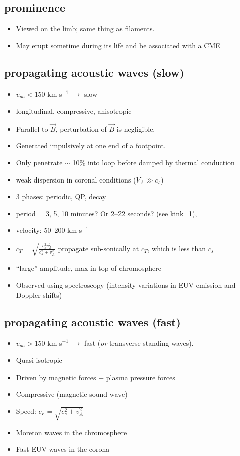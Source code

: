 \documentclass{article}
\begin{document}
\subsection{prominence}
    \begin{itemize}
        \item Viewed on the limb; same thing as filaments.
        \item May erupt sometime during its life and be associated
        with a CME
    \end{itemize}
\subsection{propagating acoustic waves (slow)}
\begin{itemize}
    \item $v_{ph}<150$ km s$^{-1}$ $\rightarrow$ slow
    \item longitudinal, compressive, anisotropic
    \item Parallel to $\vec{B}$, perturbation of $\vec{B}$ is negligible.
    \item Generated impulsively at one end of a footpoint.
    \item Only penetrate $\sim$ 10\% into loop before
        damped by thermal conduction
    \item weak dispersion in coronal conditions ($V_{A} \gg c_{s}$)
    \item 3 phases: periodic, QP, decay
    \item period = 3, 5, 10 minutes? Or 2--22 seconds? (see kink\_1),
    \item velocity: 50--200 km s$^{-1}$
    \item $c_{T} = \sqrt{\frac{c_{s}^2v_{A}^2}{c_{s}^2 + v_{A}^2}} $
        propagate sub-sonically at $c_{T}$, which is less than $c_{s}$
    \item ``large'' amplitude, max in top of chromosphere
    \item Observed using spectroscopy (intensity variations in
        EUV emission  and Doppler shifts)
\end{itemize}
\subsection{propagating acoustic waves (fast)}
\begin{itemize}
    \item $v_{ph}>150$ km s$^{-1}$ $\rightarrow$ fast
        (\emph{or} transverse standing waves).
    \item Quasi-isotropic
    \item Driven by magnetic forces + plasma pressure forces
    \item Compressive (magnetic sound wave)
    \item Speed: $c_{F} = \sqrt{c_{s}^2 + v_{A}^2} $
    \item Moreton waves in the chromosphere
    \item Fast EUV waves in the corona
\end{itemize}
\end{document}

